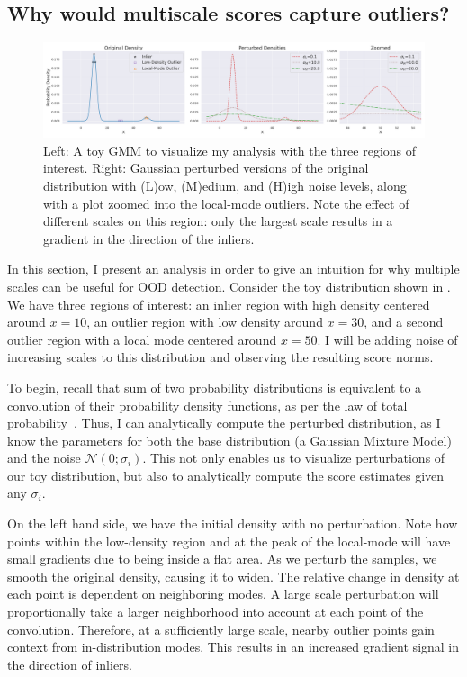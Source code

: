 \subsection*{Why would multiscale scores capture outliers?}
\label{neighborhoods}
\begin{figure}[tbhp]
\centering
\includegraphics[width=\linewidth]{figures/gmm_plot_tight.png}
\caption{Left: A toy GMM to visualize my analysis with the three regions of interest. Right: Gaussian perturbed versions of the original distribution with (L)ow, (M)edium, and (H)igh noise levels, along with a plot zoomed into the local-mode outliers. Note the effect of different scales on this region: only the largest scale results in a gradient in the direction of the inliers.}
\label{fig:toygmm}
\end{figure}

 In this section, I present an analysis in order to give an intuition for why multiple scales can be useful for OOD detection. Consider the toy distribution shown in . We have three regions of interest: an inlier region with high density centered around $x=10$, an outlier region with low density around $x=30$, and a second outlier region with a local mode centered around $x=50$. I will be adding noise of increasing scales to this distribution and observing the resulting score norms.

To begin, recall that sum of two probability distributions is equivalent to a convolution of their probability density functions, as per the law of total probability~\cite{sumisconv}. Thus, I can analytically compute the perturbed distribution, as I know the parameters for both the base distribution (a Gaussian Mixture Model) and the noise $\mathcal{N}(0; \sigma_i)$. 
This not only enables us to visualize perturbations of our toy distribution, but also to analytically compute the score estimates given any $\sigma_i$.

On the left hand side, we have the initial density with no perturbation. Note how points within the low-density region and at the peak of the local-mode will have small gradients due to being inside a flat area. As we perturb the samples, we smooth the original density, causing it to widen. The relative change in density at each point is dependent on neighboring modes. A large scale perturbation will proportionally take a larger neighborhood into account at each point of the convolution. Therefore, at a sufficiently large scale, nearby outlier points gain context from in-distribution modes. This results in an increased gradient signal in the direction of inliers. 

